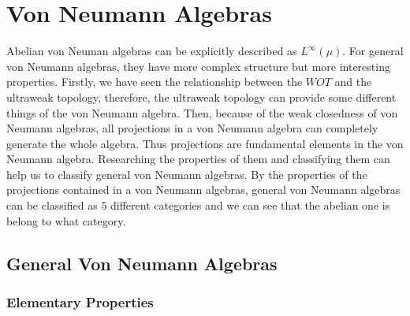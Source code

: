 \chapter{Von Neumann Algebras}

Abelian von Neuman algebras can be explicitly described as $L^{\infty}(\mu)$. For general von Neumann algebras, they have more complex structure but more interesting properties. Firstly, we have seen the relationship between the $WOT$ and the ultraweak topology, therefore, the ultraweak topology can provide some different things of the von Neumann algebra. Then, because of the weak closedness of von Neumann algebras, all projections in a von Neumann algebra can completely generate the whole algebra. Thus projections are fundamental elements in the von Neumann algebra. Researching the properties of them and classifying them can help us to classify general von Neumann algebras. By the properties of the projections contained in a von Neumann algebras, general von Neumann algebras can be classified as $5$ different categories and we can see that the abelian one is belong to what category.

\section{General Von Neumann Algebras}

\subsection{Elementary Properties}


